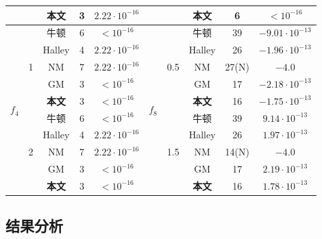\begin{center}
\begin{longtable}[!htbp]{c|c|ccc|c|c|ccc}
    & 	   & 	\textbf{本文}  & 	3  & 	$2.22 \cdot 10^{-16}$&	   & 	   & 	\textbf{本文}  & 	6  & 	$< 10^{-16}$\\

\cline{2-5}\cline{7-10}
\hline




    \multirow{10}{*}{$f_4$} & 	\multirow{5}{*}{1}  & 	牛顿  & 	6  & 	$< 10^{-16}$&	\multirow{10}{*}{$f_8$}    & 	\multirow{5}{*}{0.5}  & 	牛顿  & 	39  & 	$-9.01 \cdot 10^{-13}$\\

    & 	   & 	Halley  & 	4  & 	$2.22 \cdot 10^{-16}$&	   & 	   & 	Halley  & 	26  & 	$-1.96 \cdot 10^{-13}$\\

    & 	   & 	NM  & 	7  & 	$2.22 \cdot 10^{-16}$&	   & 	   & 	NM  & 	27(N)  & 	$-4.0$\\

    & 	   & 	GM  & 	3  & 	$< 10^{-16}$&	   & 	   & 	GM  & 	17  & 	$-2.18 \cdot 10^{-13}$\\

    & 	   & 	\textbf{本文}  & 	3  & 	$< 10^{-16}$&	   & 	   & 	\textbf{本文}  & 	16  & 	$-1.75 \cdot 10^{-13}$\\

\cline{2-5}\cline{7-10}
    & 	\multirow{5}{*}{2}  & 	牛顿  & 	6  & 	$< 10^{-16}$&	   & 	\multirow{5}{*}{1.5}  & 	牛顿  & 	39  & 	$9.14 \cdot 10^{-13}$\\

    & 	   & 	Halley  & 	4  & 	$2.22 \cdot 10^{-16}$&	   & 	   & 	Halley  & 	26  & 	$1.97 \cdot 10^{-13}$\\

    & 	   & 	NM  & 	7  & 	$2.22 \cdot 10^{-16}$&	   & 	   & 	NM  & 	14(N)  & 	$-4.0$\\

    & 	   & 	GM  & 	3  & 	$< 10^{-16}$&	   & 	   & 	GM  & 	17  & 	$2.19 \cdot 10^{-13}$\\

    & 	   & 	\textbf{本文}  & 	3  & 	$< 10^{-16}$&	   & 	   & 	\textbf{本文}  & 	16  & 	$1.78 \cdot 10^{-13}$\\

    \end{longtable}
\end{center}


\subsection{结果分析}


